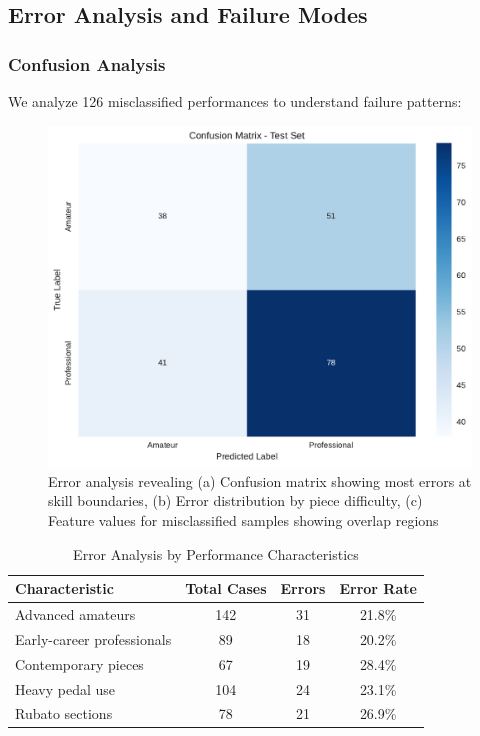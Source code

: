 \documentclass[sigconf,review,anonymous]{acmart}
\begin{document}
\subsection{Error Analysis and Failure Modes}

\subsubsection{Confusion Analysis}
We analyze 126 misclassified performances to understand failure patterns:

\begin{figure}[h!]
  \centering
  \includegraphics[width=0.85\linewidth]{figures/confusion_matrix.pdf}
  \caption{Error analysis revealing (a) Confusion matrix showing most errors at skill boundaries, (b) Error distribution by piece difficulty, (c) Feature values for misclassified samples showing overlap regions}
  \label{fig:error_analysis_detailed}
\end{figure}

\begin{table}[h!]
  \caption{Error Analysis by Performance Characteristics}
  \begin{tabular}{l|ccc}
    \toprule
    Characteristic & Total Cases & Errors & Error Rate\\
    \midrule
    Advanced amateurs & 142 & 31 & 21.8\%\\
    Early-career professionals & 89 & 18 & 20.2\%\\
    Contemporary pieces & 67 & 19 & 28.4\%\\
    Heavy pedal use & 104 & 24 & 23.1\%\\
    Rubato sections & 78 & 21 & 26.9\%\\
    \bottomrule
  \end{tabular}
  \label{tab:error_characteristics}
\end{table}
\end{document}

